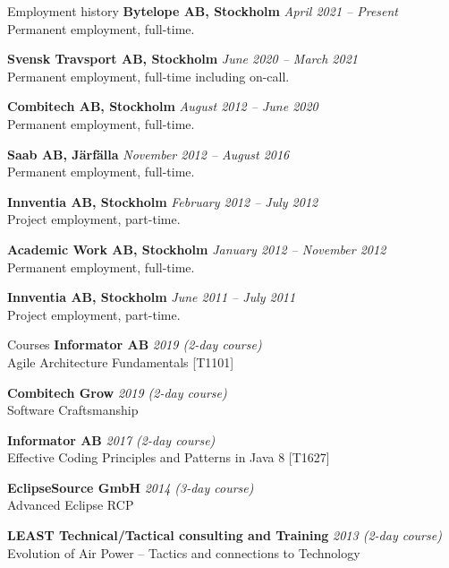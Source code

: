 \documentclass{resume}
\begin{document}
  \begin{rSection}{Employment history}
  {\bf Bytelope AB, Stockholm}
    \hfill {\em April 2021 -- Present } \\
    { Permanent employment, full-time. }

    {\bf Svensk Travsport AB, Stockholm}
    \hfill {\em June 2020 -- March 2021 } \\
    { Permanent employment, full-time including on-call. }

    {\bf Combitech AB, Stockholm}
    \hfill {\em August 2012 -- June 2020 } \\
    { Permanent employment, full-time. }

    {\bf Saab AB, Järfälla}
    \hfill {\em November 2012 -- August 2016 } \\
    { Permanent employment, full-time. }

    {\bf Innventia AB, Stockholm}
    \hfill {\em February 2012 -- July 2012 } \\
    { Project employment, part-time. }

    {\bf Academic Work AB, Stockholm}
    \hfill {\em January 2012 -- November 2012 } \\
    { Permanent employment, full-time. }

    {\bf Innventia AB, Stockholm}
    \hfill {\em June 2011 -- July 2011 } \\
    { Project employment, part-time. }

  \end{rSection}

  \begin{rSection}{Courses}
  {\bf Informator AB}
    \hfill {\em 2019 (2-day course) } \\
    { Agile Architecture Fundamentals [T1101] }

    {\bf Combitech Grow}
    \hfill {\em 2019 (2-day course) } \\
    { Software Craftsmanship }

    {\bf Informator AB}
    \hfill {\em 2017 (2-day course) } \\
    { Effective Coding Principles and Patterns in Java 8 [T1627] }

    {\bf EclipseSource GmbH}
    \hfill {\em 2014 (3-day course) } \\
    { Advanced Eclipse RCP }

    {\bf LEAST Technical/Tactical consulting and Training}
    \hfill {\em 2013 (2-day course)} \\
    { Evolution of Air Power – Tactics and connections to Technology }
  \end{rSection}
\end{document}
